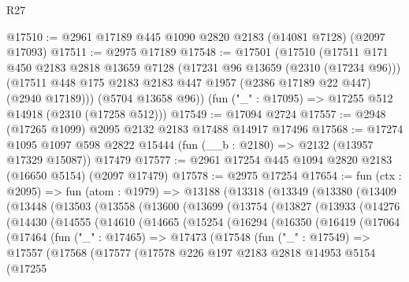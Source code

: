 \begin{lexlean}{R27}
\begin{coremodule}
@17510 := @2961 @17189 @445 @1090 @2820 @2183 (@14081 @7128) (@2097 @17093)
@17511 := @2975 @17189
@17548 := @17501
    (@17510
      (@17511
        @171
        @450
        @2183
        @2818
        @13659
        @7128
        (@17231 @96 @13659 (@2310 (@17234 @96)))
        (@17511 @448 @175 @2183 @2183 @447 @1957 (@2386 @17189 @22 @447) (@2940 @17189)))
      (@5704 @13658 @96))
    (fun ("_" : @17095) => @17255 @512 @14918 (@2310 (@17258 @512)))
@17549 := @17094 @2724
@17557 := @2948 (@17265 @1099) @2095 @2132 @2183 @17488 @14917 @17496
@17568 := @17274
    @1095
    @1097
    @598
    @2822
    @15444
    (fun (__b : @2180) => @2132 (@13957 @17329 @15087))
    @17479
@17577 := @2961 @17254 @445 @1094 @2820 @2183 (@16650 @5154) (@2097 @17479)
@17578 := @2975 @17254
@17654 := fun (ctx : @2095) =>
  fun (atom : @1979) =>
  @13188
    (@13318
      (@13349
        (@13380
          (@13409
            (@13448
              (@13503
                (@13558
                  (@13600
                    (@13699
                      (@13754
                        (@13827
                          (@13933
                            (@14276
                              (@14430
                                (@14555
                                  (@14610
                                    (@14665
                                      (@15254
                                        (@16294
                                          (@16350
                                            (@16419
                                              (@17064
                                                (@17464
                                                  (fun ("_" : @17465) =>
                                                  @17473
                                                    (@17548
                                                      (fun ("_" : @17549) =>
                                                      @17557
                                                        (@17568
                                                          (@17577
                                                            (@17578
                                                              @226
                                                              @197
                                                              @2183
                                                              @2818
                                                              @14953
                                                              @5154
                                                              (@17255

\end{coremodule}
\end{lexlean}

